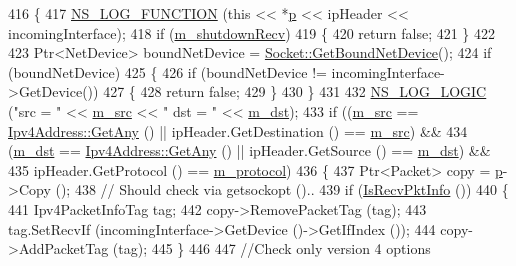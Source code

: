 \begin{DoxyCode}
416 \{
417   \hyperlink{log-macros-disabled_8h_a90b90d5bad1f39cb1b64923ea94c0761}{NS\_LOG\_FUNCTION} (\textcolor{keyword}{this} << *\hyperlink{lte__link__budget_8m_ac9de518908a968428863f829398a4e62}{p} << ipHeader << incomingInterface);
418   \textcolor{keywordflow}{if} (\hyperlink{classns3_1_1Ipv4RawSocketImpl_abb193a17208627ab4f74a9a95e0ef6e9}{m\_shutdownRecv})
419     \{
420       \textcolor{keywordflow}{return} \textcolor{keyword}{false};
421     \}
422 
423   Ptr<NetDevice> boundNetDevice = \hyperlink{classns3_1_1Socket_a04ae6be2aded03caaa262e274dc8a2fd}{Socket::GetBoundNetDevice}();
424   \textcolor{keywordflow}{if} (boundNetDevice)
425     \{
426       \textcolor{keywordflow}{if} (boundNetDevice != incomingInterface->GetDevice())
427         \{
428           \textcolor{keywordflow}{return} \textcolor{keyword}{false};
429         \}
430     \}
431 
432   \hyperlink{group__logging_ga88acd260151caf2db9c0fc84997f45ce}{NS\_LOG\_LOGIC} (\textcolor{stringliteral}{"src = "} << \hyperlink{classns3_1_1Ipv4RawSocketImpl_a1881de88180f919a385b14db64b93932}{m\_src} << \textcolor{stringliteral}{" dst = "} << \hyperlink{classns3_1_1Ipv4RawSocketImpl_a36a7c8ea8152272b055706247b97bef2}{m\_dst});
433   \textcolor{keywordflow}{if} ((\hyperlink{classns3_1_1Ipv4RawSocketImpl_a1881de88180f919a385b14db64b93932}{m\_src} == \hyperlink{classns3_1_1Ipv4Address_a7a39b330c8e701183a411d5779fca1a4}{Ipv4Address::GetAny} () || ipHeader.GetDestination () == 
      \hyperlink{classns3_1_1Ipv4RawSocketImpl_a1881de88180f919a385b14db64b93932}{m\_src}) &&
434       (\hyperlink{classns3_1_1Ipv4RawSocketImpl_a36a7c8ea8152272b055706247b97bef2}{m\_dst} == \hyperlink{classns3_1_1Ipv4Address_a7a39b330c8e701183a411d5779fca1a4}{Ipv4Address::GetAny} () || ipHeader.GetSource () == 
      \hyperlink{classns3_1_1Ipv4RawSocketImpl_a36a7c8ea8152272b055706247b97bef2}{m\_dst}) &&
435       ipHeader.GetProtocol () == \hyperlink{classns3_1_1Ipv4RawSocketImpl_a924effb0eb9a6cbbf1daeb3a7b7ffc94}{m\_protocol})
436     \{
437       Ptr<Packet> copy = \hyperlink{lte__link__budget_8m_ac9de518908a968428863f829398a4e62}{p}->Copy ();
438       \textcolor{comment}{// Should check via getsockopt ()..}
439       \textcolor{keywordflow}{if} (\hyperlink{classns3_1_1Socket_a104a42cdf0290b4e8867b4c0a77aadc2}{IsRecvPktInfo} ())
440         \{
441           Ipv4PacketInfoTag tag;
442           copy->RemovePacketTag (tag);
443           tag.SetRecvIf (incomingInterface->GetDevice ()->GetIfIndex ());
444           copy->AddPacketTag (tag);
445         \}
446 
447       \textcolor{comment}{//Check only version 4 options}

\end{DoxyCode}
